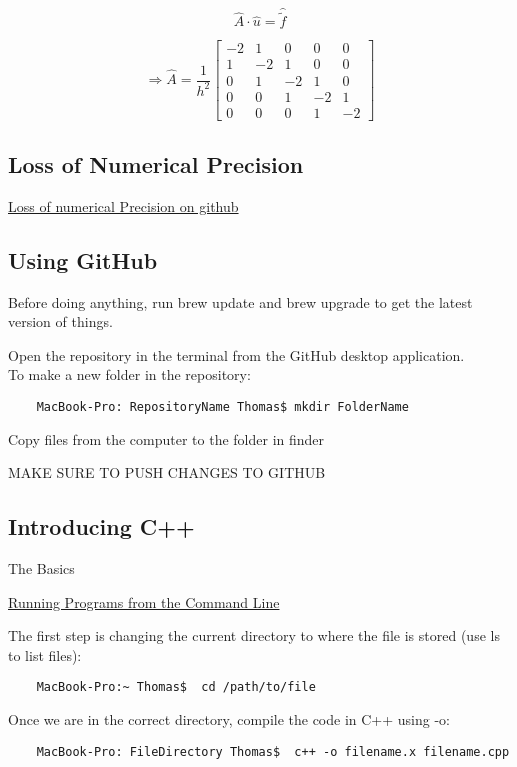 \documentclass[10pt]{article} %
\begin{document}
\pagebreak

\[ \hat{A} \cdot \hat{u} = \hat{\tilde{f}}  \]

\[ \Rightarrow \hat{A} = \dfrac{1}{h^2} \left[ \begin{array}{ccccc} -2&1&0&0&0 \\ 1&-2&1&0&0  \\ 0&1&-2&1&0 \\ 0&0&1&-2&1 \\ 0&0&0&1&-2 \end{array} \right] \]



\subsection{Loss of Numerical Precision}

\href{http://compphysics.github.io/ComputationalPhysicsMSU/doc/pub/languages/pdf/languages-print.pdf}{Loss of numerical Precision on github}

\subsection{Using GitHub}

Before doing anything, run brew update and brew upgrade to get the latest version of things.

Open the repository in the terminal from the GitHub desktop application. \\ To make a new folder in the repository:
\begin{verbatim}
    MacBook-Pro: RepositoryName Thomas$ mkdir FolderName
\end{verbatim}
Copy files from the computer to the folder in finder

MAKE SURE TO PUSH CHANGES TO GITHUB

\subsection{Introducing C++}

The Basics

\underline{Running Programs from the Command Line}

The first step is changing the current directory to where the file is stored (use ls to list files):
\begin{verbatim}
    MacBook-Pro:~ Thomas$  cd /path/to/file
\end{verbatim}

Once we are in the correct directory, compile the code in C++ using -o:
\begin{verbatim}
    MacBook-Pro: FileDirectory Thomas$  c++ -o filename.x filename.cpp
\end{verbatim}
\end{document}
